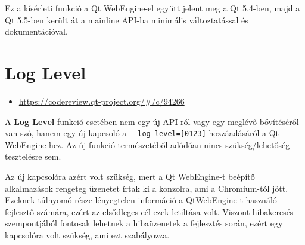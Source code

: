 \documentclass[12pt]{report}
\let\origurl\url
\renewcommand{\url}[1]{%
    \textcolor{blue}{\origurl{#1}}
}
\newcommand{\gerrit}[1]{%
    \textcolor{qtgreen}{\origurl{https://codereview.qt-project.org/\#/c/#1}}
}
\begin{document}
Ez a kísérleti funkció a Qt WebEngine-el együtt jelent meg a Qt 5.4-ben, majd a Qt 5.5-ben
került át a mainline API-ba minimális változtatással és dokumentációval.


\section{Log Level}

\begin{center}
    \begin{reviewbox}
        \begin{itemize}
            \renewcommand{\labelitemi}{\textcolor{qtgreen}{$\blacktriangleright$}}
            \item \gerrit{94266}
        \end{itemize}
    \end{reviewbox}
\end{center}

\noindent
A \textbf{Log Level} funkció esetében nem egy új API-ról vagy egy meglévő bővítéséről van
szó, hanem egy új kapcsoló a \texttt{-{}-log-level=[0123]} hozzáadásáról a Qt WebEngine-hez.
Az új funkció természetéből adódóan nincs szükség/lehetőség tesztelésre sem.

Az új kapcsolóra azért volt szükség, mert a Qt WebEngine-t beépítő alkalmazások rengeteg
üzenetet írtak ki a konzolra, ami a Chromium-tól jött. Ezeknek túlnyomó része lényegtelen
információ a QtWebEngine-t használó fejlesztő számára, ezért az elsődleges cél ezek
letiltása volt. Viszont hibakeresés szempontjából fontosak lehetnek a hibaüzenetek a
fejlesztés során, ezért egy kapcsolóra volt szükség, ami ezt szabályozza.
\end{document}
